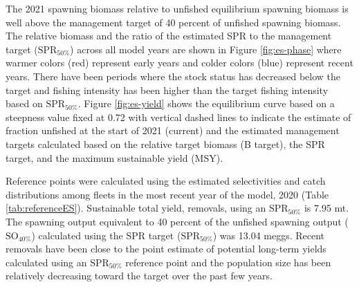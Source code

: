\documentclass[11pt,
  english,
  a4paper,
]{article}
\begin{document}
\leavevmode\tagmcend\tagstructend


The 2021 spawning biomass relative to unfished equilibrium spawning biomass is well above the management target of 40 percent of unfished spawning biomass. The relative biomass and the ratio of the estimated SPR to the management target ({\(\text{SPR}_{50\%}\)\leavevmode\tagmcend\tagstructend}) across all model years are shown in Figure \ref{fig:es-phase} where warmer colors (red) represent early years and colder colors (blue) represent recent years. There have been periods where the stock status has decreased below the target and fishing intensity has been higher than the target fishing intensity based on {\(\text{SPR}_{50\%}\)\leavevmode\tagmcend\tagstructend}. Figure \ref{fig:es-yield} shows the equilibrium curve based on a steepness value fixed at 0.72 with vertical dashed lines to indicate the estimate of fraction unfished at the start of 2021 (current) and the estimated management targets calculated based on the relative target biomass (B target), the SPR target, and the maximum sustainable yield (MSY).

\leavevmode\tagmcend\tagstructend\par


Reference points were calculated using the estimated selectivities and catch distributions among fleets in the most recent year of the model, 2020 (Table \ref{tab:referenceES}). Sustainable total yield, removals, using an {\(\text{SPR}_{50\%}\)\leavevmode\tagmcend\tagstructend} is 7.95 mt. The spawning output equivalent to 40 percent of the unfished spawning output ({\(\text{SO}_{40\%}\)\leavevmode\tagmcend\tagstructend}) calculated using the SPR target ({\(\text{SPR}_{50\%}\)\leavevmode\tagmcend\tagstructend}) was 13.04 meggs. Recent removals have been close to the point estimate of potential long-term yields calculated using an {\(\text{SPR}_{50\%}\)\leavevmode\tagmcend\tagstructend} reference point and the population size has been relatively decreasing toward the target over the past few years.

\leavevmode\tagmcend\tagstructend\par
\end{document}
